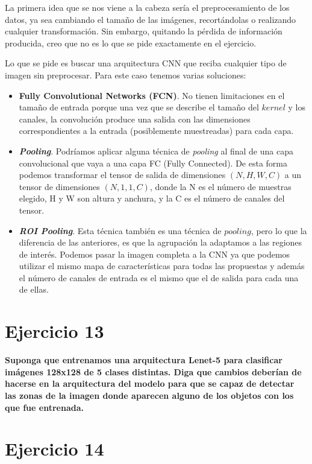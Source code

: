 \documentclass[11pt,a4paper]{article}
\begin{document}
La primera idea que se nos viene a la cabeza sería el preprocesamiento de los datos, ya sea cambiando el tamaño de las imágenes, recortándolas o realizando cualquier
transformación. Sin embargo, quitando la pérdida de información producida, creo que no es lo que se pide exactamente en el ejercicio.

Lo que se pide es buscar una arquitectura CNN que reciba cualquier tipo de imagen sin preprocesar. Para este caso tenemos varias soluciones:
\begin{itemize}
	\item \textbf{Fully Convolutional Networks (FCN)}. No tienen limitaciones en el tamaño de entrada porque una vez que se describe el tamaño del $kernel$ y los canales,
		  la convolución produce una salida con las dimensiones correspondientes a la entrada (posiblemente muestreadas) para cada capa.
	\item \textbf{\textit{Pooling}}. Podríamos aplicar alguna técnica de \textit{pooling} al final de una capa convolucional que vaya a una capa FC (Fully Connected). De
		  esta forma podemos transformar el tensor de salida de dimensiones $(N, H, W, C)$ a un tensor de dimensiones $(N, 1, 1, C)$, donde la N es el número de muestras
		  elegido, H y W son altura y anchura, y la C es el número de canales del tensor.
	\item \textbf{\textit{ROI Pooling}}. Esta técnica también es una técnica de $pooling$, pero lo que la diferencia de las anteriores, es que la agrupación la adaptamos
		  a las regiones de interés. Podemos pasar la imagen completa a la CNN ya que podemos utilizar el mismo mapa de características para todas las propuestas y además
		  el número de canales de entrada es el mismo que el de salida para cada una de ellas.


\end{itemize}


\section*{Ejercicio 13}

\textbf{Suponga que entrenamos una arquitectura Lenet-5 para clasificar imágenes 128x128 de 5 clases distintas. Diga que cambios deberían de hacerse en la arquitectura
del modelo para que se capaz de detectar las zonas de la imagen donde aparecen alguno de los objetos con los que fue entrenada.}



\section*{Ejercicio 14}
\end{document}
